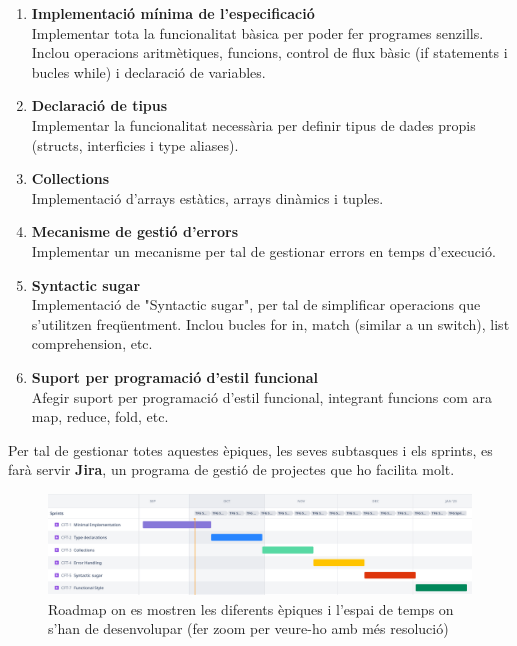 ﻿\documentclass{article}
\begin{document}
\begin{enumerate}
    \item \textbf{Implementació mínima de l'especificació}\\
        Implementar tota la funcionalitat bàsica per poder fer programes senzills.
        Inclou operacions aritmètiques, funcions, control de flux bàsic (if
        statements i bucles while) i declaració de variables.

    \item \textbf{Declaració de tipus} \\
        Implementar la funcionalitat necessària per definir tipus de dades
        propis (structs, interficies i type aliases).

    \item \textbf{Collections}\\
        Implementació d'arrays estàtics, arrays dinàmics i tuples.

    \item \textbf{Mecanisme de gestió d'errors}\\
        Implementar un mecanisme per tal de gestionar errors en temps d'execució.

    \item \textbf{Syntactic sugar}\\
        Implementació de "Syntactic sugar", per tal de simplificar operacions
        que s'utilitzen freqüentment. Inclou bucles for in, match (similar a un
        switch), list comprehension, etc.

    \item \textbf{Suport per programació d'estil funcional}\\
        Afegir suport per programació d'estil funcional, integrant funcions com
        ara map, reduce, fold, etc.
\end{enumerate}

Per tal de gestionar totes aquestes èpiques, les seves subtasques i els sprints,
es farà servir \textbf{Jira}, un programa de gestió de projectes que ho facilita molt.

\begin{figure}[ht]
    \includegraphics[width=\linewidth]{roadmap}
    \centering
    \captionsetup{justification=centering}
    \caption{Roadmap on es mostren les diferents èpiques i l'espai de temps on s'han de desenvolupar (fer zoom per veure-ho amb més resolució)}
\end{figure}
\end{document}
